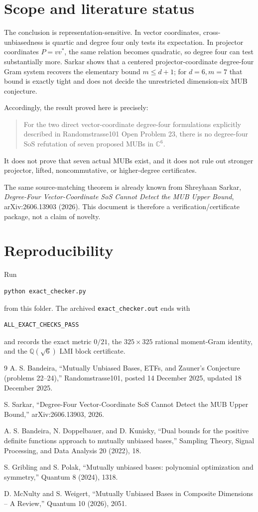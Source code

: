 \documentclass[11pt]{article}
\newcommand{\C}{\mathbb C}
\begin{document}
\section{Scope and literature status}
The conclusion is representation-sensitive.  In vector coordinates, cross-unbiasedness is quartic and degree four only tests its expectation.  In projector coordinates $P=vv^*$, the same relation becomes quadratic, so degree four can test substantially more.  Sarkar shows that a centered projector-coordinate degree-four Gram system recovers the elementary bound $m\le d+1$; for $d=6,m=7$ that bound is exactly tight and does not decide the unrestricted dimension-six MUB conjecture.

Accordingly, the result proved here is precisely:
\begin{quote}
For the two direct vector-coordinate degree-four formulations explicitly described in Randomstrasse101 Open Problem 23, there is no degree-four SoS refutation of seven proposed MUBs in $\C^6$.
\end{quote}
It does not prove that seven actual MUBs exist, and it does not rule out stronger projector, lifted, noncommutative, or higher-degree certificates.

The same source-matching theorem is already known from Shreyhaan Sarkar, \emph{Degree-Four Vector-Coordinate SoS Cannot Detect the MUB Upper Bound}, arXiv:2606.13903 (2026).  This document is therefore a verification/certificate package, not a claim of novelty.

\section{Reproducibility}
Run
\begin{verbatim}
python exact_checker.py
\end{verbatim}
from this folder.  The archived \texttt{exact\_checker.out} ends with
\begin{verbatim}
ALL_EXACT_CHECKS_PASS
\end{verbatim}
and records the exact metric $0/21$, the $325\times325$ rational moment-Gram identity, and the $\mathbb Q(\sqrt6)$ LMI block certificate.

\begin{thebibliography}{9}
A. S. Bandeira, ``Mutually Unbiased Bases, ETFs, and Zauner's Conjecture (problems 22--24),'' Randomstrasse101, posted 14 December 2025, updated 18 December 2025.

S. Sarkar, ``Degree-Four Vector-Coordinate SoS Cannot Detect the MUB Upper Bound,'' arXiv:2606.13903, 2026.

A. S. Bandeira, N. Doppelbauer, and D. Kunisky, ``Dual bounds for the positive definite functions approach to mutually unbiased bases,'' Sampling Theory, Signal Processing, and Data Analysis 20 (2022), 18.

S. Gribling and S. Polak, ``Mutually unbiased bases: polynomial optimization and symmetry,'' Quantum 8 (2024), 1318.

D. McNulty and S. Weigert, ``Mutually Unbiased Bases in Composite Dimensions -- A Review,'' Quantum 10 (2026), 2051.
\end{thebibliography}
\end{document}
